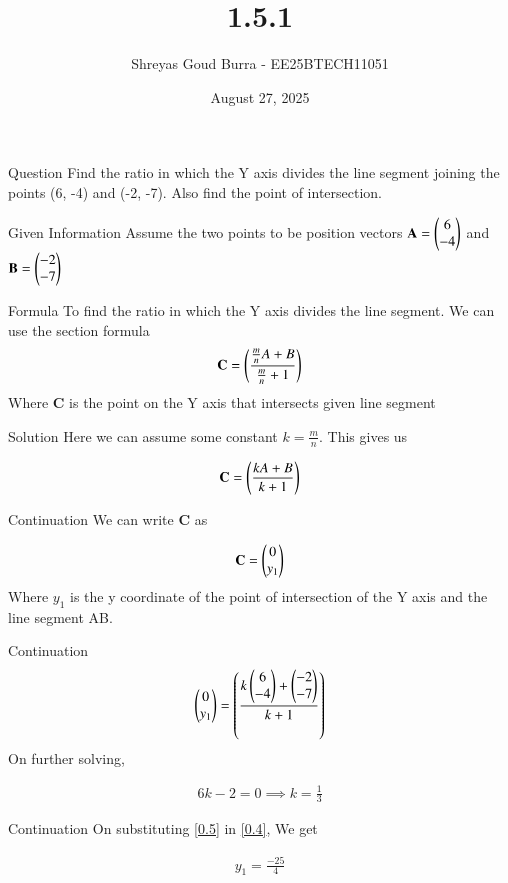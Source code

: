 \documentclass{beamer}
\title %
{1.5.1}
\date{August 27, 2025}
\author %
{Shreyas Goud Burra - EE25BTECH11051}
\begin{document}
\frame{\titlepage}
\begin{frame}{Question}
    Find the ratio in which the Y axis divides the line segment joining the points (6, -4)
and (-2, -7). Also find the point of intersection.

\end{frame}
\begin{frame}{Given Information}
    Assume the two points to be position vectors $\textbf{A} = \begin{pmatrix}6 \\ -4\end{pmatrix}$ and $\textbf{B} = \begin{pmatrix}-2 \\ -7\end{pmatrix}$
\end{frame}

\begin{frame}{Formula}
To find the ratio in which the Y axis divides the line segment. We can use the section formula\\
    \begin{align}
        \textbf{C} = \left(\frac{\frac{m}{n}A+B}{\frac{m}{n}+1}\right)
        \label{0.1}
    \end{align}
Where \textbf{C} is the point on the Y axis that intersects given line segment
\end{frame}
\begin{frame}{Solution}
    Here we can assume some constant $k=\frac{m}{n}$. This gives us

\begin{align}
    \textbf{C} = \left(\frac{kA+B}{k+1}\right)
    \label{0.2}
\end{align}
\end{frame}
\begin{frame}{Continuation}
    We can write \textbf{C} as 
    
    \begin{align}
        \mathbf{C} = \begin{pmatrix}0 \\ y_1\end{pmatrix}
        \label{0.3}
    \end{align}
    Where $y_1$ is the y coordinate of the point of intersection of the Y axis and the line segment AB.
\end{frame}

\begin{frame}{Continuation}
    \begin{align}
    \begin{pmatrix}0 \\ y_1\end{pmatrix} = \left(\frac{k\begin{pmatrix}6 \\ -4\end{pmatrix}+\begin{pmatrix}-2 \\ -7\end{pmatrix}}{k+1}\right)
    \label{0.4}
\end{align}
On further solving,

\begin{align}
    6k-2=0 \implies k = \frac{1}{3}
    \label{0.5}
\end{align}
\end{frame}
\begin{frame}{Continuation}
    On substituting \ref{0.5} in \ref{0.4}, We get

\begin{align}
    y_1 = \frac{-25}{4}
\end{align}
\end{frame}
\end{document}

